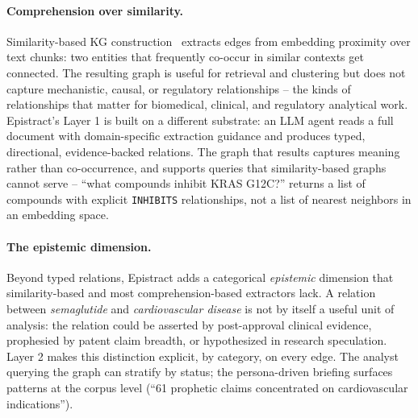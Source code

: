 \paragraph{Comprehension over similarity.}
Similarity-based KG construction~\cite{edge2024graphrag} extracts edges from embedding proximity over text chunks: two entities that frequently co-occur in similar contexts get connected. The resulting graph is useful for retrieval and clustering but does not capture mechanistic, causal, or regulatory relationships -- the kinds of relationships that matter for biomedical, clinical, and regulatory analytical work. Epistract's Layer 1 is built on a different substrate: an LLM agent reads a full document with domain-specific extraction guidance and produces typed, directional, evidence-backed relations. The graph that results captures meaning rather than co-occurrence, and supports queries that similarity-based graphs cannot serve -- ``what compounds inhibit KRAS G12C?'' returns a list of compounds with explicit \texttt{INHIBITS} relationships, not a list of nearest neighbors in an embedding space.

\paragraph{The epistemic dimension.}
Beyond typed relations, Epistract adds a categorical \emph{epistemic} dimension that similarity-based and most comprehension-based extractors lack. A relation between \emph{semaglutide} and \emph{cardiovascular disease} is not by itself a useful unit of analysis: the relation could be asserted by post-approval clinical evidence, prophesied by patent claim breadth, or hypothesized in research speculation. Layer 2 makes this distinction explicit, by category, on every edge. The analyst querying the graph can stratify by status; the persona-driven briefing surfaces patterns at the corpus level (``61 prophetic claims concentrated on cardiovascular indications'').

